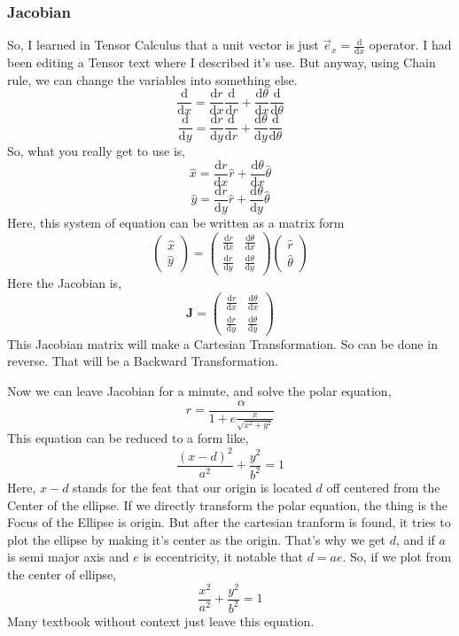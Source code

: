 \documentclass[11pt,a4paper]{article}
\begin{document}
\subsubsection{ Jacobian }
So, I learned in Tensor Calculus that a unit vector is just $\vec{e}_x = \frac{\mathrm{d} }{\mathrm{d} x}$ operator. I had been editing a Tensor text where I described it's use. But anyway, using Chain rule, we can change the variables into something else.
\[ 
\frac{\mathrm{d} }{\mathrm{d} x} = \frac{\mathrm{d} r}{\mathrm{d} x} \frac{\mathrm{d} }{\mathrm{d} r} + 
\frac{\mathrm{d} \theta}{\mathrm{d} x} \frac{\mathrm{d} }{\mathrm{d} \theta}
\]
\[ 
\frac{\mathrm{d} }{\mathrm{d} y} = \frac{\mathrm{d} r}{\mathrm{d} y} \frac{\mathrm{d} }{\mathrm{d} r}
+ \frac{\mathrm{d} \theta}{\mathrm{d} y} \frac{\mathrm{d} }{\mathrm{d} \theta}
\]
So, what you really get to use is, 
\[ 
\hat{x} = \frac{\mathrm{d} r}{\mathrm{d} x} \hat{r} + \frac{\mathrm{d} \theta}{\mathrm{d} x} \hat{\theta}
\]
\[ 
\hat{ y} = \frac{\mathrm{d} r}{\mathrm{d} y} \hat{r} + \frac{\mathrm{d} \theta}{\mathrm{d} y} \hat{ \theta}
\]
Here, this system of equation can be written as a matrix form
\[
    \begin{pmatrix} \hat{x} \\ \hat{y} \end{pmatrix} =
    \begin{pmatrix} \frac{\mathrm{d} r}{\mathrm{d} x} & 
        \frac{\mathrm{d} \theta}{\mathrm{d} x} \\[1ex]
    \frac{\mathrm{d} r}{\mathrm{d} y} & \frac{\mathrm{d} \theta}{\mathrm{d} y}
\end{pmatrix} 
\begin{pmatrix} \hat{r} \\ \hat{\theta} \end{pmatrix}
\]
Here the Jacobian is,
\[ 
\mathbf{ J } =
\begin{pmatrix} \frac{\mathrm{d} r}{\mathrm{d} x} & \frac{\mathrm{d} \theta}{\mathrm{d} x} \\[1em]
    \frac{\mathrm{d} r}{\mathrm{d} y} & \frac{\mathrm{d} \theta}{\mathrm{d} y}
\end{pmatrix} 
\]
This Jacobian matrix will make a Cartesian Transformation. So can be done in reverse. That will be a Backward Transformation. 



Now we can leave Jacobian for a minute, and solve the polar equation,
\[ 
r = \frac{\alpha}{1 + e \frac{x}{\sqrt{x^2+ y^2} }}
\]
This equation can be reduced to a form like,
\[ 
    \frac{\left( x -d \right) ^2}{a^2} + \frac{y^2}{b^2} = 1
\]
Here, $x-d$ stands for the feat that our origin is located $d$ off centered from the Center of the ellipse. If we directly transform the polar equation, the thing is the Focus of the Ellipse is origin. But after the cartesian tranform is found, it tries to plot the ellipse by making it's center as the origin. That's why we get $d$, and if $a$ is semi major axis and $e$ is eccentricity, it notable that $d=ae$. So, if we plot from the center of ellipse,
\[ 
    \boxed{ \frac{x^2}{a^2} + \frac{y^2}{b^2} = 1}
\]
Many textbook without context just leave this equation. 
\end{document}
